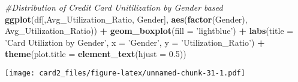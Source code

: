 \documentclass[]{article}
\newenvironment{Shaded}{\begin{snugshade}}{\end{snugshade}}
\newcommand{\CommentTok}[1]{\textcolor[rgb]{0.56,0.35,0.01}{\textit{#1}}}
\newcommand{\DataTypeTok}[1]{\textcolor[rgb]{0.13,0.29,0.53}{#1}}
\newcommand{\DecValTok}[1]{\textcolor[rgb]{0.00,0.00,0.81}{#1}}
\newcommand{\FloatTok}[1]{\textcolor[rgb]{0.00,0.00,0.81}{#1}}
\newcommand{\KeywordTok}[1]{\textcolor[rgb]{0.13,0.29,0.53}{\textbf{#1}}}
\newcommand{\NormalTok}[1]{#1}
\newcommand{\OperatorTok}[1]{\textcolor[rgb]{0.81,0.36,0.00}{\textbf{#1}}}
\newcommand{\StringTok}[1]{\textcolor[rgb]{0.31,0.60,0.02}{#1}}
\begin{document}
\begin{Shaded}
\begin{Highlighting}[]
\CommentTok{#Distribution of Credit Card Unitilization by Gender based}
\KeywordTok{ggplot}\NormalTok{(df[,Avg_Utilization_Ratio, Gender], }\KeywordTok{aes}\NormalTok{(}\KeywordTok{factor}\NormalTok{(Gender), Avg_Utilization_Ratio)) }\OperatorTok{+}\StringTok{ }\KeywordTok{geom_boxplot}\NormalTok{(}\DataTypeTok{fill =} \StringTok{'lightblue'}\NormalTok{) }\OperatorTok{+}\StringTok{ }\KeywordTok{labs}\NormalTok{(}\DataTypeTok{title =} \StringTok{'Card Utiliztion by Gender'}\NormalTok{, }\DataTypeTok{x =} \StringTok{'Gender'}\NormalTok{, }\DataTypeTok{y =} \StringTok{'Utilization_Ratio'}\NormalTok{) }\OperatorTok{+}\StringTok{ }\KeywordTok{theme}\NormalTok{(}\DataTypeTok{plot.title =} \KeywordTok{element_text}\NormalTok{(}\DataTypeTok{hjust =} \FloatTok{0.5}\NormalTok{))}
\end{Highlighting}
\end{Shaded}

\texttt{[image: card2\_files/figure-latex/unnamed-chunk-31-1.pdf]}

\begin{Shaded}
\end{Shaded}
\end{document}
